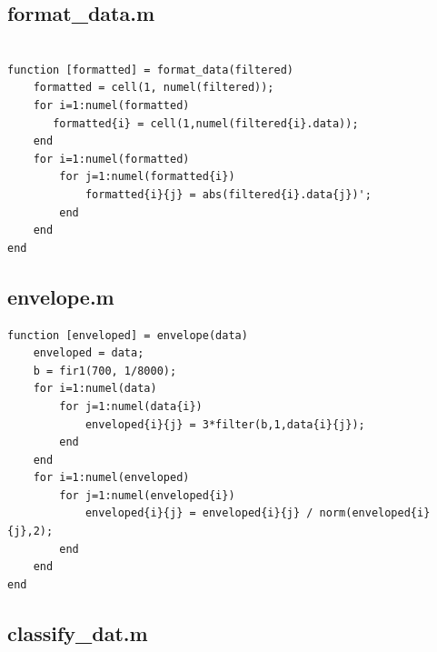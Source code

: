 \documentclass[12pt]{article}
\begin{document}
\subsection{format\_data.m}

\begin{verbatim}

function [formatted] = format_data(filtered)
    formatted = cell(1, numel(filtered));
    for i=1:numel(formatted)
       formatted{i} = cell(1,numel(filtered{i}.data));
    end
    for i=1:numel(formatted)
        for j=1:numel(formatted{i})
            formatted{i}{j} = abs(filtered{i}.data{j})';
        end
    end
end

\end{verbatim}

\subsection{envelope.m}

\begin{verbatim}
function [enveloped] = envelope(data)
    enveloped = data;
    b = fir1(700, 1/8000);
    for i=1:numel(data)
        for j=1:numel(data{i})
            enveloped{i}{j} = 3*filter(b,1,data{i}{j});
        end
    end
    for i=1:numel(enveloped)
        for j=1:numel(enveloped{i})
            enveloped{i}{j} = enveloped{i}{j} / norm(enveloped{i}{j},2);
        end
    end
end
\end{verbatim}

\subsection{classify\_dat.m}
\end{document}
